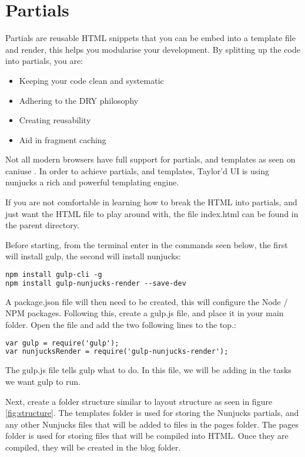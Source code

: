 \newpage
\chapter*{Partials}


Partials are reusable HTML snippets that you can be embed into a template file and render, this helps you modularise your development. By splitting up the code into partials, you are:

\begin{itemize}
	\item Keeping your code clean and systematic
	\item Adhering to the DRY philosophy
	\item Creating reusability
	\item Aid in fragment caching
\end{itemize}

Not all modern browsers have full support for partials, and templates as seen on caniuse \citep{CANI17}. In order to achieve partials, and templates, Taylor'd UI is using nunjucks a rich and powerful templating engine. 

If you are not comfortable in learning how to break the HTML into partials, and just want the HTML file to play around with, the file index.html can be found in the parent directory.

Before starting, from the terminal enter in the commands seen below, the first will install gulp, the second will install nunjucks:

\begin{lstlisting}[language=HTML]
npm install gulp-cli -g
npm install gulp-nunjucks-render --save-dev
\end{lstlisting}

A package.json file will then need to be created, this will configure the Node / NPM packages. Following this, create a gulp.js file, and place it in your main folder. Open the file and add the two following lines to the top.:

\begin{lstlisting}[language=HTML]
var gulp = require('gulp');
var nunjucksRender = require('gulp-nunjucks-render');
\end{lstlisting}

The gulp.js file tells gulp what to do. In this file, we will be adding in the tasks we want gulp to run.

Next, create a folder structure similar to layout structure as seen in figure \ref{fig:structure}. The templates folder is used for storing the Nunjucks partials, and any other Nunjucks files that will be added to files in the pages folder. The pages folder is used for storing files that will be compiled into HTML. Once they are compiled, they will be created in the blog folder.


